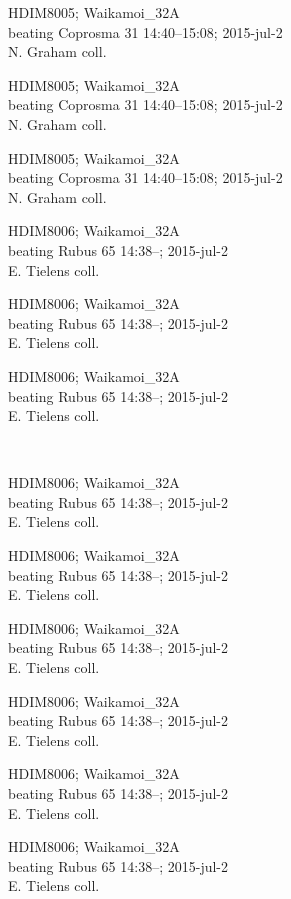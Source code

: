\documentclass[2pt]{extarticle}
\begin{document}
\noindent
\parbox{0.16\textwidth}{\tiny \raggedright \rule[-0.3\baselineskip]{0pt}{10pt}HDIM8005; Waikamoi\_32A\\ beating Coprosma 31 14:40--15:08; 2015-jul-2\\ N. Graham coll.}
\parbox{0.16\textwidth}{\tiny \raggedright \rule[-0.3\baselineskip]{0pt}{10pt}HDIM8005; Waikamoi\_32A\\ beating Coprosma 31 14:40--15:08; 2015-jul-2\\ N. Graham coll.}
\parbox{0.16\textwidth}{\tiny \raggedright \rule[-0.3\baselineskip]{0pt}{10pt}HDIM8005; Waikamoi\_32A\\ beating Coprosma 31 14:40--15:08; 2015-jul-2\\ N. Graham coll.}
\parbox{0.16\textwidth}{\tiny \raggedright \rule[-0.3\baselineskip]{0pt}{10pt}HDIM8006; Waikamoi\_32A\\ beating Rubus 65 14:38--; 2015-jul-2\\ E. Tielens coll.}
\parbox{0.16\textwidth}{\tiny \raggedright \rule[-0.3\baselineskip]{0pt}{10pt}HDIM8006; Waikamoi\_32A\\ beating Rubus 65 14:38--; 2015-jul-2\\ E. Tielens coll.}
\parbox{0.16\textwidth}{\tiny \raggedright \rule[-0.3\baselineskip]{0pt}{10pt}HDIM8006; Waikamoi\_32A\\ beating Rubus 65 14:38--; 2015-jul-2\\ E. Tielens coll.} \\ 
\vspace{0.001in} 

\noindent
\parbox{0.16\textwidth}{\tiny \raggedright \rule[-0.3\baselineskip]{0pt}{10pt}HDIM8006; Waikamoi\_32A\\ beating Rubus 65 14:38--; 2015-jul-2\\ E. Tielens coll.}
\parbox{0.16\textwidth}{\tiny \raggedright \rule[-0.3\baselineskip]{0pt}{10pt}HDIM8006; Waikamoi\_32A\\ beating Rubus 65 14:38--; 2015-jul-2\\ E. Tielens coll.}
\parbox{0.16\textwidth}{\tiny \raggedright \rule[-0.3\baselineskip]{0pt}{10pt}HDIM8006; Waikamoi\_32A\\ beating Rubus 65 14:38--; 2015-jul-2\\ E. Tielens coll.}
\parbox{0.16\textwidth}{\tiny \raggedright \rule[-0.3\baselineskip]{0pt}{10pt}HDIM8006; Waikamoi\_32A\\ beating Rubus 65 14:38--; 2015-jul-2\\ E. Tielens coll.}
\parbox{0.16\textwidth}{\tiny \raggedright \rule[-0.3\baselineskip]{0pt}{10pt}HDIM8006; Waikamoi\_32A\\ beating Rubus 65 14:38--; 2015-jul-2\\ E. Tielens coll.}
\parbox{0.16\textwidth}{\tiny \raggedright \rule[-0.3\baselineskip]{0pt}{10pt}HDIM8006; Waikamoi\_32A\\ beating Rubus 65 14:38--; 2015-jul-2\\ E. Tielens coll.} \\ 
\vspace{0.001in} 
\end{document}
